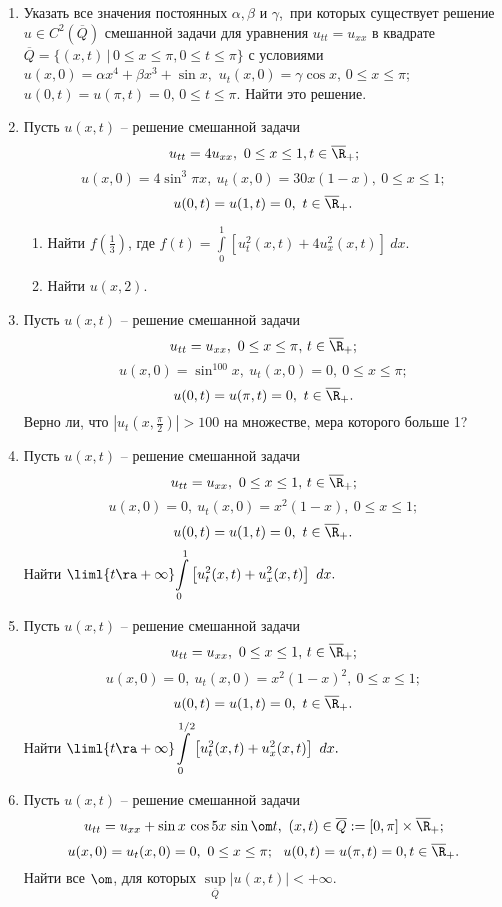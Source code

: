 \documentclass[a4paper]{article}
\def\a{\alpha}
\def\b{\beta}
\def\g{\gamma}
\begin{document}
\begin{enumerate}
\item
Указать все значения постоянных $\a, \b$ и $\g$,\, при которых существует
решение $u\in C^2(\overline Q)$ смешанной задачи для уравнения
$u_{tt}=u_{xx}$ в квадрате $\overline Q=\{(x,t)\,|\,0\le x\le\pi,
0\le t\le\pi\} $ с условиями $u(x,0)=\a x^4+\b x^3+
\sin x,$ $u_t(x,0)=\g \cos x,$\,$0\le x\le\pi$;\
$u(0,t)=u(\pi,t)=0,$\,$0\le t\le\pi$.  Найти это
решение.

\item
Пусть $u(x,t)$ -- решение смешанной задачи
$$
u_{tt}=4u_{xx},\ 0\le x\le 1, t\in \overline{\R}_+;$$
$$
u(x,0)= 4 \sin^3 \pi x, \ u_t(x,0)=30 x(1-x), \ 0\le x\le 1;$$
$$u(0,t)=u(1,t)=0, \ t\in\overline{\R}_+.$$
\begin{enumerate}

   \item
   Найти $f(\frac{1}{3})$, где $f(t)=\displaystyle{\int\limits_{0}^{1}
   \left[u_t^2(x,t)+4u_x^2(x,t)\right]\ dx}.$

   \item
   Найти $u(x,2).$

\end{enumerate}

\item
Пусть $u(x,t)$ -- решение смешанной задачи
$$u_{tt}=u_{xx},\ 0\le x\le\pi,\, t\in\overline{\R}_+;$$
$$u(x,0)=\sin^{100}x,\ u_t(x,0)=0,\ 0\le x\le \pi;$$
$$u(0,t)=u(\pi, t)=0,\ t\in\overline{\R}_+.$$
Верно ли, что $|u_t(x,\frac{\pi}{2})|>100$ на множестве, мера которого
больше 1?

\item
Пусть $u(x,t)$ -- решение смешанной задачи
$$u_{tt}=u_{xx},\ 0\le x\le1,\, t\in\overline{\R}_+;$$
$$u(x,0)=0,\ u_t(x,0)=x^2(1-x),\ 0\le x\le 1;$$
$$u(0,t)=u(1, t)=0,\ t\in\overline{\R}_+.$$
Найти $\liml{t\ra+\infty}\displaystyle{\int\limits_{0}^{1}
\left[u_t^2(x,t)+u_x^2(x,t)\right]\ dx}.$

\item
Пусть $u(x,t)$ -- решение смешанной задачи
$$u_{tt}=u_{xx},\ 0\le x\le1,\, t\in\overline{\R}_+;$$
$$u(x,0)=0,\ u_t(x,0)=x^2(1-x)^2,\ 0\le x\le 1;$$
$$u(0,t)=u(1, t)=0, \ t\in\overline{\R}_+.$$
Найти $\liml{t\ra+\infty}\displaystyle{\int\limits_{0}^{1/2}
\left[u_t^2(x,t)+u_x^2(x,t)\right]\ dx}.$

\item
Пусть $u(x,t)$ -- решение смешанной задачи
$$u_{tt}=u_{xx}+\sin x\, \cos 5x\, \sin\om t,\ (x,t)\in \overline Q:=
[0,\pi]\times\overline{\R}_+;$$
$$u(x,0)=u_t(x,0)=0,\ 0\le x\le \pi; \ \ u(0,t)=u(\pi, t)=0,
t\in\overline{\R}_+.$$
Найти все $\om$, для которых $\sup\limits_{\overline Q}
|u(x,t)|<+\infty.$


\end{enumerate}
\end{document}
